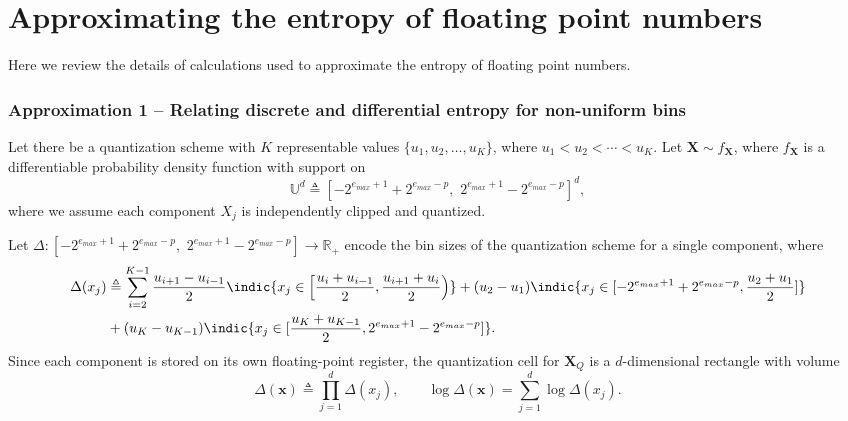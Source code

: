 \documentclass[12pt,onecolumn, margin=1in]{IEEEtran}
\begin{document}
\FloatBarrier
\pagebreak
\section{Approximating the entropy of floating point numbers}\label{app:FPN}

Here we review the details of calculations used to approximate the entropy of floating point numbers. 









\subsubsection*{Approximation 1 -- Relating discrete and differential entropy for non-uniform bins}\label{app:FPN_app1}

Let there be a quantization scheme with $K$ representable values
$\{u_1, u_2, \ldots, u_K\}$, where $u_1 < u_2 < \cdots < u_K$.
Let $\mathbf{X} \sim f_\mathbf{X}$, where $f_\mathbf{X}$ is a differentiable probability density function with support on
\begin{equation}
\mathbb{U}^d \triangleq \left[-2^{e_{max} + 1} + 2^{e_{max} - p}, \,\, 2^{e_{max} + 1} - 2^{e_{max} - p}\right]^d,
\end{equation}
where we assume each component $X_j$ is independently clipped and quantized.

Let $\Delta: \left[-2^{e_{max} + 1} + 2^{e_{max} - p},\,\, 2^{e_{max} + 1} - 2^{e_{max} - p}\right] \to \mathbb{R}_+$
encode the bin sizes of the quantization scheme for a single component, where
\begin{equation*}
    \begin{aligned}
    \Delta(x_j) &\triangleq \sum_{i=2}^{K-1}\frac{u_{i+1} - u_{i-1}}{2}
    \indic{x_j \in \Big[\frac{u_i+u_{i-1}}{2}, \frac{u_{i+1}+u_i}{2}\Big)} + (u_2 - u_1)\indic{x_j \in [-2^{e_{max} + 1} + 2^{e_{max} - p}, \frac{u_{2} + u_{1}}{2}]}\nonumber\\
    & + (u_K - u_{K-1})\indic{x_j \in [\frac{u_{K} + u_{K-1}}{2}, 2^{e_{max} + 1} - 2^{e_{max} - p}]}.
    \end{aligned}
\end{equation*}
Since each component is stored on its own floating-point register, the quantization cell for $\mathbf{X}_Q$ is a $d$-dimensional rectangle with volume
\begin{equation}
\Delta(\mathbf{x}) \triangleq \prod_{j=1}^{d} \Delta(x_j),
\qquad
\log \Delta(\mathbf{x}) = \sum_{j=1}^{d} \log \Delta(x_j).
\end{equation}
\end{document}
